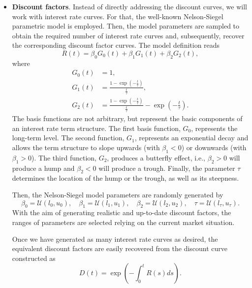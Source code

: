 \begin{itemize}
            \item \textbf{Discount factors}. Instead of directly addressing the discount curves, we will work with interest rate curves. For that, the well-known Nelson-Siegel parametric model \cite{nelson1987} is employed. Then, the model parameters are sampled to obtain the required number of interest rate curves and, subsequently, recover the corresponding discount factor curves. The model definition reads
            \begin{equation*}
                R(t) = \beta_0 G_0(t) + \beta_1 G_1(t) + \beta_2 G_2(t),
            \end{equation*}
            where
            \begin{equation*}
            \begin{aligned}
                G_0(t) &= 1, \\
                G_1(t) &= \frac{1 - \exp\left(-\frac{t}{\tau}\right)}{\frac{t}{\tau}}, \\
                G_2(t) &= \frac{1 - \exp\left(-\frac{t}{\tau}\right)}{\frac{t}{\tau}} - \exp\left(-\frac{t}{\tau}\right).
            \end{aligned}
            \end{equation*}
            The basis functions are not arbitrary, but represent the basic components of an interest rate term structure. The first basis function, $G_0$, represents the long-term level. The second function, $G_1$, represents an exponential decay and allows the term structure to slope upwards (with $\beta_1 < 0$) or downwards (with $\beta_1 > 0$). The third function, $G_2$, produces a butterfly effect, i.e., $\beta_2 > 0$ will produce a hump and $\beta_2 < 0$ will produce a trough. Finally, the parameter $\tau$ determines the location of the hump or the trough, as well as its steepness.

            Then, the Nelson-Siegel model parameters are randomly generated by
            \begin{equation*}
                \beta_0 = \mathcal{U}(l_0, u_0), \quad \beta_1 = \mathcal{U}(l_1, u_1), \quad \beta_2 = \mathcal{U}(l_2, u_2), \quad \tau = \mathcal{U}(l_{\tau}, u_{\tau}).
            \end{equation*}
            With the aim of generating realistic and up-to-date discount factors, the ranges of parameters are selected relying on the current market situation.
        
            Once we have generated as many interest rate curves as desired, the equivalent discount factors are easily recovered from the discount curve constructed as
            \begin{equation*}
                D(t) = \exp\left(-\int_0^t R(s)ds\right).
            \end{equation*}


\end{itemize}
